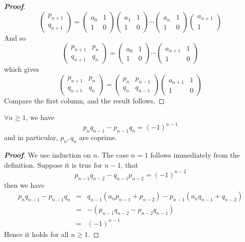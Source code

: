 \begin{proof}[\bf Proof]
$$\begin{pmatrix} p_{n+1} \\ q_{n+1} \end{pmatrix} = \begin{pmatrix} a_0 & 1\\ 1 & 0 \end{pmatrix}
\begin{pmatrix} a_1 & 1\\ 1 & 0 \end{pmatrix} \cdots
\begin{pmatrix} a_n & 1 \\ 1 & 0 \end{pmatrix} \begin{pmatrix} a_{n+1} \\ 1 \end{pmatrix}$$
And so
$$\begin{pmatrix}p_{n+1} & p_n\\q_{n+1}&q_n \end{pmatrix}=
\begin{pmatrix} a_0&1\\1&0 \end{pmatrix} \cdots
\begin{pmatrix} a_{n+1} & 1\\1&0 \end{pmatrix}$$
which gives
$$\begin{pmatrix}p_{n+1} & p_n\\q_{n+1}&q_n \end{pmatrix}=
\begin{pmatrix}p_n & p_{n-1}\\q_n&q_{n-1} \end{pmatrix}
\begin{pmatrix}a_{n+1}&1\\1&0 \end{pmatrix}$$
Compare the first column, and the result follows.
\end{proof}
\begin{lemma} $\forall n \ge 1$, we have
$$p_n q_{n-1} - p_{n-1}q_n =(-1)^{n-1}$$ and in particular, $p_n,q_n$ are coprime.
\end{lemma}
\begin{proof}[\bf Proof] We use induction on $n$. The case $n=1$ follows immediately from the definition.
Suppose it is true for $n-1$, that
$$p_{n-1}q_{n-2}-q_{n-1}p_{n-2}=(-1)^{n-2}$$
then we have
\begin{eqnarray*}
p_n q_{n-1}-p_{n-1}q_n & = &q_{n-1}(a_n p_{n-1}+p_{n-2})-p_{n-1}(a_n q_{n-1}+q_{n-2})\\
&=&-(p_{n-1}q_{n-2}-p_{n-2}q_{n-1})\\
&=&(-1)^{n-1}
\end{eqnarray*}
Hence it holds for all $n \ge 1$.
\end{proof}
